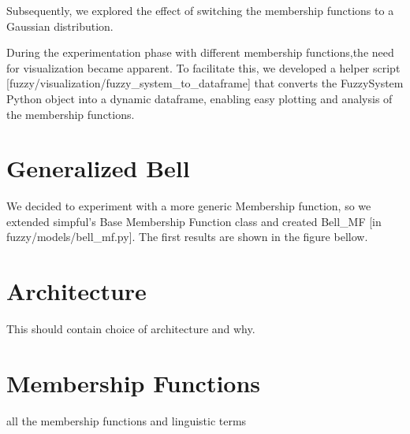 \documentclass[11pt]{report}
\begin{document}
Subsequently, we explored the effect of switching the membership functions to a Gaussian distribution.

\begin{figure}[h]
\centering
\end{figure}

During the experimentation phase with different membership functions,the need for visualization became apparent.
To facilitate this, we developed a helper script [fuzzy/visualization/fuzzy\_system\_to\_dataframe] that converts the
FuzzySystem Python object into a dynamic dataframe, enabling easy plotting and analysis of the membership functions.



\section{Generalized Bell}
We decided to experiment with a more generic Membership function, so we
extended simpful's Base Membership Function class and created Bell\_MF [in fuzzy/models/bell\_mf.py].
The first results are shown in the figure bellow.


\section{Architecture}
This should contain choice of architecture and why.

\section{Membership Functions}
all the membership functions and linguistic terms
\end{document}
